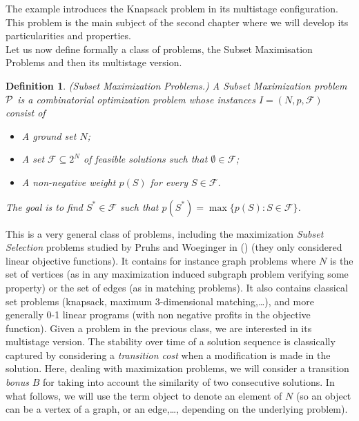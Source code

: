 \documentclass[a4paper]{book}
\newtheorem{definition}{Definition}
\begin{document}
The example introduces the {\sc Knapsack} problem in its multistage configuration. This problem is the main subject of the second chapter where we will develop its particularities and properties.\\

Let us now define formally a class of problems, the Subset Maximisation Problems and then its multistage version.

\begin{definition}

\emph{(Subset Maximization Problems.)} A Subset Maximization problem $\cal P$ is a combinatorial optimization problem whose instances $I=(N,p,\mathcal{F})$ consist of
\begin{itemize}
    \item A ground set $N$;
    \item A set $\mathcal{F}\subseteq 2^N$ of feasible solutions such that $\emptyset\in\mathcal{F}$;
    \item A non-negative weight $p(S)$ for every $S \in \mathcal{F}$.
\end{itemize}
The goal is to find $S^*\in \mathcal{F}$ such that $p(S^*)=\max\{p(S):S\in\mathcal{F}\}$.
\end{definition}
This is a very general class of problems, including the maximization \emph{Subset Selection} problems studied by Pruhs and Woeginger in (\cite{Pruhs}) (they only considered linear objective functions). It contains for instance graph problems where $N$ is the set of vertices (as in any maximization induced subgraph problem verifying some property) or the set of edges (as in  matching problems). It also contains classical set problems (knapsack, maximum 3-dimensional matching,\dots), and more generally 0-1 linear programs (with non negative profits in the objective function).
Given a problem in the previous class, we are interested in its multistage version.
The stability over time of a solution sequence is classically captured by considering a \textit{transition cost} when a modification is made in the solution. Here, dealing with maximization problems, we will consider a transition {\it bonus} $B$ for taking into account the similarity of two consecutive solutions.
In what follows, we will use the term object to denote an element of $N$ (so an object can be a vertex of a graph, or an edge,\dots, depending on the underlying problem). 	%
\end{document}
